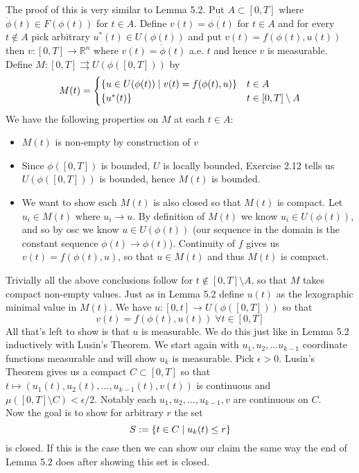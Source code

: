 \documentclass{article}
\newenvironment{ex}[1]
  {\renewcommand\theexercise{#1}\exercise}
  {\endexercise}
\newcommand{\R}[1]{\mathbb{R}^{#1}}
\begin{document}
\begin{ex}{5.3} %
  The proof of this is very similar to Lemma 5.2. Put $A \subset [0, T]$ where $\dot{\phi}(t) \in F(\phi(t))$ for $t \in A$. Define $v(t) = \dot{\phi(t)}$ for $t \in A$ and for every $t \not\in A$ pick arbitrary $u^*(t) \in U(\phi(t))$ and  put $v(t) = f(\phi(t), u(t))$ then $v : [0, T] \to \R{n}$ where $v(t) = \dot{\phi}(t)$ a.e. $t$ and hence $v$ is measurable. Define $M : [0, T] \rightrightarrows U(\phi([0, T]))$ by
  $$
  M(t) = \begin{cases}
    \{ u \in U(\phi(t)) \mid v(t) = f(\phi(t), u) \} & t \in A \\
    \{ u^*(t) \} & t \in [0, T] \setminus A
  \end{cases}
  $$
  We have the following properties on $M$ at each $t \in A$:
  \begin{itemize}
    \item $M(t)$ is non-empty by construction of $v$
    \item Since $\phi([0, T])$ is bounded, $U$ is locally bounded, Exercise 2.12 tells us $U(\phi([0, T]))$ is bounded, hence $M(t)$ is bounded.
    \item We want to show each $M(t)$ is also closed so that $M(t)$ is compact. Let $u_i \in M(t)$ where $u_i \to u$. By definition of $M(t)$ we know $u_i \in U(\phi(t))$, and so by osc we know $u \in U(\phi(t))$ (our sequence in the domain is the constant sequence $\phi(t) \to \phi(t)$). Continuity of $f$ gives us $v(t) = f(\phi(t), u)$, so that $u \in M(t)$ and thus $M(t)$ is compact.
  \end{itemize}
  Trivially all the above conclusions follow for $t \not\in [0, T] \setminus A$, so that $M$ takes compact non-empty values. Just as in Lemma 5.2 define $u(t)$ as the lexographic minimal value in $M(t)$. We have $u : [0, t] \to U(\phi([0, T]))$ so that
  $$
  v(t) = f(\phi(t), u(t)) \; \forall t \in [0, T]
  $$
  All that's left to show is that $u$ is measurable. We do this just like in Lemma 5.2 inductively with Lusin's Theorem. We start again with $u_1, u_2, ... u_{k-1}$ coordinate functions measurable and will show $u_k$ is measurable. Pick $\epsilon > 0$. Lusin's Theorem gives us a compact $C \subset [0, T]$ so that $t \mapsto (u_1(t), u_2(t), ..., u_{k-1}(t), v(t))$ is continuous and $\mu([0, T] \setminus C) < \epsilon / 2$. Notably each $u_1, u_2, ..., u_{k-1}, v$ are continuous on $C$. \, \\

  Now the goal is to show for arbitrary $r$ the set
  $$
  S := \{ t \in C \mid u_k(t) \le r \}
  $$
  is closed. If this is the case then we can show our claim the same way the end of Lemma 5.2 does after showing this set is closed. \, \\


\end{ex}
\end{document}
